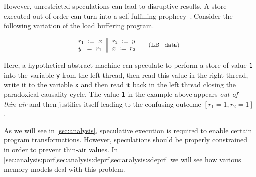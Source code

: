However, unrestricted speculations can lead to disruptive results. 
A store executed out of order can turn into 
a self-fulfilling prophecy~\cite{Boehm-Demsky:MSPC14}.
Consider the following variation of the load buffering program. 

\begin{equation*}
\small
\inarrII{
  \readInst{}{r_1}{x}   \\
  \writeInst{}{y}{r_1}  \\
}{
  \readInst{}{r_2}{y}   \\
  \writeInst{}{x}{r_2}  \\
}
\tag{LB+data}\label{ex:lb+data}
\end{equation*}

Here, a hypothetical abstract machine can speculate 
to perform a store of value \texttt{1} into the variable \texttt{y}
from the left thread, then read this value in the right thread, 
write it to the variable \texttt{x} and then read it back in the
left thread closing the paradoxical causality cycle.
The value \texttt{1} in the example above appears \emph{out of thin-air}
and then justifies itself leading to the confusing outcome ${[r_1=1, r_2=1]}$.

As we will see in \cref{sec:analysis}, speculative execution 
is required to enable certain program transformations. 
However, speculations should be properly constrained
in order to prevent thin-air values. 
In \cref{sec:analysis:porf,sec:analysis:deprf,sec:analysis:sdeprf}
we will see how various memory models deal with this problem. 
